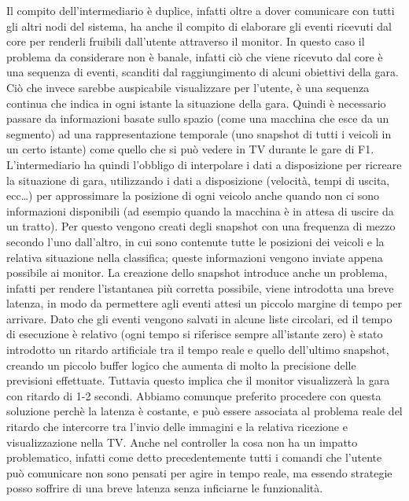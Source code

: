 Il compito dell’intermediario è duplice, infatti oltre a dover comunicare con tutti gli altri nodi del sistema, ha anche il compito di elaborare gli eventi ricevuti dal core per renderli fruibili dall’utente attraverso il monitor.
In questo caso il problema da considerare non è banale, infatti ciò che viene ricevuto dal core è una sequenza di eventi, scanditi dal raggiungimento di alcuni obiettivi della gara. Ciò che invece sarebbe auspicabile visualizzare per l’utente, è una sequenza continua che indica in ogni istante la situazione della gara. Quindi è necessario passare da informazioni basate sullo spazio (come una macchina che esce da un segmento) ad una rappresentazione temporale (uno snapshot di tutti i veicoli in un certo istante) come quello che si può vedere in TV durante le gare di F1.
L’intermediario ha quindi l’obbligo di interpolare i dati a disposizione per ricreare la situazione di gara, utilizzando i dati a disposizione (velocità, tempi di uscita, ecc…) per approssimare la posizione di ogni veicolo anche quando non ci sono informazioni disponibili (ad esempio quando la macchina è in attesa di uscire da un tratto).
Per questo vengono creati degli snapshot con una frequenza di mezzo secondo l’uno dall’altro, in cui sono contenute tutte le posizioni dei veicoli e la relativa situazione nella classifica; queste informazioni vengono inviate appena possibile ai monitor.
La creazione dello snapshot introduce anche un problema, infatti per rendere l’istantanea più corretta possibile, viene introdotta una breve latenza, in modo da permettere agli eventi attesi un piccolo margine di tempo per arrivare. Dato che gli eventi vengono salvati in alcune liste circolari, ed il tempo di esecuzione è relativo (ogni tempo si riferisce sempre all’istante zero) è stato introdotto un ritardo artificiale tra il tempo reale e quello dell’ultimo snapshot, creando un piccolo buffer logico che aumenta di molto la precisione delle previsioni effettuate. Tuttavia questo implica che il monitor visualizzerà la gara con ritardo di 1-2 secondi. Abbiamo comunque preferito procedere con questa soluzione perchè la latenza è costante, e può essere associata al problema reale del ritardo che intercorre tra l’invio delle immagini e la relativa ricezione e visualizzazione nella TV. Anche nel controller la cosa non ha un impatto problematico, infatti come detto precedentemente tutti i comandi che l’utente può comunicare non sono pensati per agire in tempo reale, ma essendo strategie posso soffrire di una breve latenza senza inficiarne le funzionalità.

